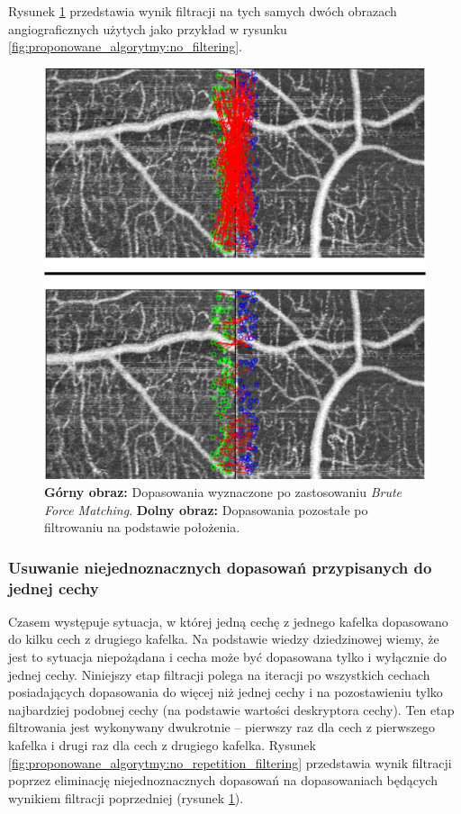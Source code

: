 Rysunek \ref{fig:proponowane_algorytmy:after_placement} przedstawia wynik filtracji na tych samych dwóch obrazach angiograficznych użytych jako przykład w rysunku \ref{fig:proponowane_algorytmy:no_filtering}.

\begin{figure}[htb]
  \centering
  \includegraphics[width=\textwidth]{gfx/after_placement}
  \caption{\textbf{Górny obraz:} Dopasowania wyznaczone po zastosowaniu \textit{Brute Force Matching}. \textbf{Dolny obraz:} Dopasowania pozostałe po filtrowaniu na podstawie położenia.}
  \label{fig:proponowane_algorytmy:after_placement}
\end{figure}

\subsubsection{Usuwanie niejednoznacznych dopasowań przypisanych do jednej cechy}
\label{sec:proponowane_algorytmy:no_repetition_filtering}

Czasem występuje sytuacja, w której jedną cechę z jednego kafelka dopasowano do kilku cech z drugiego kafelka. Na podstawie wiedzy dziedzinowej wiemy, że jest to sytuacja niepożądana i cecha może być dopasowana tylko i wyłącznie do jednej cechy. Niniejszy etap filtracji polega na iteracji po wszystkich cechach posiadających dopasowania do więcej niż jednej cechy i na pozostawieniu tylko najbardziej podobnej cechy (na podstawie wartości deskryptora cechy). Ten etap filtrowania jest wykonywany dwukrotnie -- pierwszy raz dla cech z pierwszego kafelka i drugi raz dla cech z drugiego kafelka. Rysunek \ref{fig:proponowane_algorytmy:no_repetition_filtering} przedstawia wynik filtracji poprzez eliminację niejednoznacznych dopasowań na dopasowaniach będących wynikiem filtracji poprzedniej (rysunek \ref{fig:proponowane_algorytmy:after_placement}).

